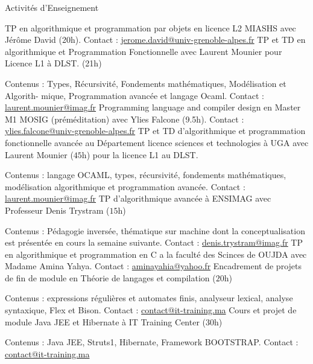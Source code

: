 

\begin{rubric}{Activités d’Enseignement}

    \entry*[$2017$ -- $2018$] TP en algorithmique et programmation par objets en licence L2 MIASHS avec Jérôme David (20h).
    Contact :  \href{mailto:jerome.david@univ-grenoble-alpes.fr}{jerome.david@univ-grenoble-alpes.fr}
    \entry*[$2017$ -- $2018$] TP et TD en algorithmique et Programmation Fonctionnelle avec Laurent Mounier pour Licence L1 à DLST. (21h)
    \par Contenus : Types, Récursivité, Fondements mathématiques, Modélisation et Algorith-
mique, Programmation avancée et langage Ocaml.
	 Contact :  \href{mailto:laurent.mounier@imag.fr}{laurent.mounier@imag.fr}
    \entry*[$2017$ -- $2018$] Programming language and compiler design en Master M1 MOSIG (préméditation)  avec Ylies Falcone (9.5h).
    Contact :  \href{mailto:ylies.falcone@univ-grenoble-alpes.fr}{ylies.falcone@univ-grenoble-alpes.fr}
\entry*[$2016$ -- $2017$]%
	TP et TD d'algorithmique et programmation fonctionnelle avancée au Département licence sciences et technologies à UGA avec Laurent Mounier ($45$h) pour la licence L1 au DLST.
	\par Contenus : langage OCAML, types, récursivité, fondements mathématiques, modélisation   
    algorithmique et programmation avancée.
	 Contact :  \href{mailto:laurent.mounier@imag.fr}{laurent.mounier@imag.fr}
%
\entry*[$2016$ -- $2017$]%
	TP d'algorithmique avancée à ENSIMAG avec Professeur Denis Trystram ($15$h)
	\par Contenus : Pédagogie inversée, thématique sur machine dont la conceptualisation est présentée en cours la semaine suivante. 
	 Contact :  \href{mailto:denis.trystram@imag.fr}{denis.trystram@imag.fr}
%
\entry*[$2014$ -- $2015$] TP en algorithmique et programmation en C a la faculté des Scinces de OUJDA avec Madame Amina Yahya.
     Contact :  \href{mailto:aminayahia@yahoo.fr}{aminayahia@yahoo.fr}
\entry*[$2014$ -- $2015$]
        Encadrement de projets de fin de module en Théorie de langages et compilation ($20$h)
	\par Contenus : expressions régulières et automates finis, analyseur lexical, analyse syntaxique, Flex et Bison.
	 Contact :  \href{mailto:contact@it-training.ma}{contact@it-training.ma}
%
\entry*[$2014$ -- $2015$]%
        Cours et projet de module Java JEE et Hibernate à IT Training Center ($30$h)
	\par Contenus : Java JEE, Struts1, Hibernate, Framework BOOTSTRAP.
	 Contact :  \href{mailto:contact@it-training.ma}{contact@it-training.ma}
%
\end{rubric}
